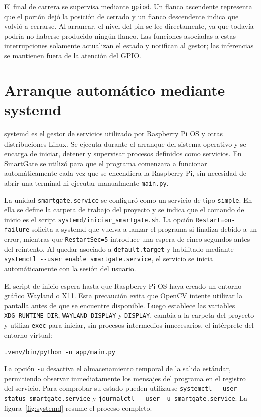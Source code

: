El final de carrera se supervisa mediante \texttt{gpiod}. Un flanco ascendente representa que el portón dejó la posición de cerrado y un flanco descendente indica que volvió a cerrarse. Al arrancar, el nivel del pin se lee directamente, ya que todavía podría no haberse producido ningún flanco. Las funciones asociadas a estas interrupciones solamente actualizan el estado y notifican al gestor; las inferencias se mantienen fuera de la atención del GPIO.

\section{Arranque automático mediante systemd}
\label{sec:systemd}

systemd es el gestor de servicios utilizado por Raspberry Pi OS y otras distribuciones Linux. Se ejecuta durante el arranque del sistema operativo y se encarga de iniciar, detener y supervisar procesos definidos como servicios. En SmartGate se utilizó para que el programa comenzara a funcionar automáticamente cada vez que se encendiera la Raspberry Pi, sin necesidad de abrir una terminal ni ejecutar manualmente \texttt{main.py}.

La unidad \texttt{smartgate.service} se configuró como un servicio de tipo \texttt{simple}. En ella se define la carpeta de trabajo del proyecto y se indica que el comando de inicio es el script \texttt{systemd/iniciar\_smartgate.sh}. La opción \texttt{Restart=on-failure} solicita a systemd que vuelva a lanzar el programa si finaliza debido a un error, mientras que \texttt{RestartSec=5} introduce una espera de cinco segundos antes del reintento. Al quedar asociado a \texttt{default.target} y habilitado mediante \texttt{systemctl -{}-user enable smartgate.service}, el servicio se inicia automáticamente con la sesión del usuario.

El script de inicio espera hasta que Raspberry Pi OS haya creado un entorno gráfico Wayland o X11. Esta precaución evita que OpenCV intente utilizar la pantalla antes de que se encuentre disponible. Luego establece las variables \texttt{XDG\_RUNTIME\_DIR}, \texttt{WAYLAND\_DISPLAY} y \texttt{DISPLAY}, cambia a la carpeta del proyecto y utiliza \texttt{exec} para iniciar, sin procesos intermedios innecesarios, el intérprete del entorno virtual:

\begin{center}
\texttt{.venv/bin/python -u app/main.py}
\end{center}

La opción \texttt{-u} desactiva el almacenamiento temporal de la salida estándar, permitiendo observar inmediatamente los mensajes del programa en el registro del servicio. Para comprobar su estado pueden utilizarse \texttt{systemctl -{}-user status smartgate.service} y \texttt{journalctl -{}-user -u smartgate.service}. La figura~\ref{fig:systemd} resume el proceso completo.

